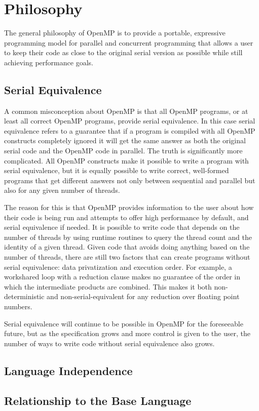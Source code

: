 \section{Philosophy}
\label{sec:philosophy}



The general philosophy of OpenMP is to provide a portable, expressive
programming model for parallel and concurrent programming that allows a user to
keep their code as close to the original serial version as possible while still
achieving performance goals.

\subsection{Serial Equivalence}
\label{sub:serial_equivalence}

A common misconception about OpenMP is that all OpenMP programs, or at least all
correct OpenMP programs, provide serial equivalence. In this case serial
equivalence refers to a guarantee that if a program is compiled with all OpenMP
constructs completely ignored it will get the same answer as both the original
serial code and the OpenMP code in parallel.  The truth is significantly more
complicated.  All OpenMP constructs make it possible to write a program with
serial equivalence, but it is equally possible to write correct, well-formed
programs that get different answers not only between sequential and parallel but
also for any given number of threads.

The reason for this is that OpenMP provides information to the user about how
their code is being run and attempts to offer high performance by default, and
serial equivalence if needed.  It is possible to write code that depends on the
number of threads by using runtime routines to query the thread count and the
identity of a given thread.  Given code that avoids doing anything based on the
number of threads, there are still two factors that can create programs without
serial equivalence: data privatization and execution order.  For example, a
workshared loop with a reduction clause makes no guarantee of the order in which
the intermediate products are combined.  This makes it both non-deterministic
and non-serial-equivalent for any reduction over floating point numbers.

Serial equivalence will continue to be possible in OpenMP for the foreseeable
future, but as the specification grows and more control is given to the user,
the number of ways to write code without serial equivalence also grows.

\subsection{Language Independence}
\label{sub:language_independence}

\subsection{Relationship to the Base Language}
\label{sub:relationship_to_the_base_language}



